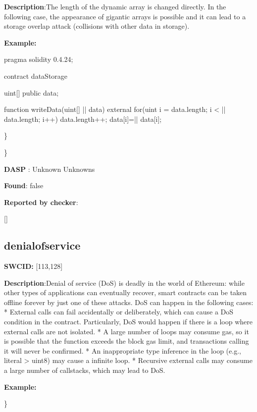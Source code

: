 \documentclass{article}
\begin{document}
\textbf{Description}:The length of the dynamic array is changed directly. In the following case, the appearance of gigantic arrays is possible and it can lead to a storage overlap attack (collisions with other data in storage).


\textbf{Example:} 
\begin{ffcode} 

pragma solidity 0.4.24;

contract dataStorage {
    uint[] public data;

    function writeData(uint[] |\textunderscore| data) external {
        for(uint i = data.length; i < |\textunderscore| data.length; i++) {
            data.length++;
            data[i]=|\textunderscore| data[i];
        }
    }
}

\end{ffcode} 
\} 

\} 

\textbf{DASP} : Unknown Unknowns

\textbf{Found}: false

\textbf{Reported by checker}: 
\begin{ffcode} 

[]
\end{ffcode} 
\subsection{denial{\textunderscore}of{\textunderscore}service} 
\textbf{SWC{\textunderscore}ID:} [113,128]

\textbf{Description}:Denial of service (DoS) is deadly in the world of Ethereum: while other types of applications can eventually recover, smart contracts can be taken offline forever by just one of these attacks. DoS can happen in the following cases:
* External calls can fail accidentally or deliberately, which can cause a DoS condition in the contract. Particularly, DoS would happen if there is a loop where external calls are not isolated.
* A large number of loops may consume gas, so it is possible that the function exceeds the block gas limit, and transactions calling it will never be confirmed.
* An inappropriate type inference in the loop (e.g., literal {\textendash}> uint8) may cause a infinite loop.
* Recursive external calls may consume a large number of callstacks, which may lead to DoS.


\textbf{Example:} 
\begin{ffcode} 

for (var i = 0; i < array.length; i++) { /* ... */

\end{ffcode} 
\} 
\end{document}
